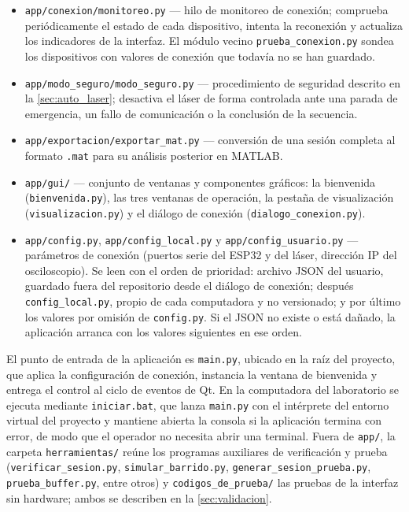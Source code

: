 {\begin{itemize}
  \item \texttt{app/conexion/monitoreo.py} — hilo de monitoreo de
    conexión; comprueba periódicamente el estado de cada dispositivo,
    intenta la reconexión y actualiza los indicadores de la interfaz.
    El módulo vecino \texttt{prueba\_conexion.py} sondea los
    dispositivos con valores de conexión que todavía no se han
    guardado.

  \item \texttt{app/modo\_seguro/modo\_seguro.py} — procedimiento de
    seguridad descrito en la \cref{sec:auto_laser}; desactiva el láser
    de forma controlada ante una parada de emergencia, un fallo de
    comunicación o la conclusión de la secuencia.

  \item \texttt{app/exportacion/exportar\_mat.py} — conversión de una
    sesión completa al formato \texttt{.mat} para su análisis
    posterior en MATLAB.

  \item \texttt{app/gui/} — conjunto de ventanas y componentes
    gráficos: la bienvenida (\texttt{bienvenida.py}), las tres
    ventanas de operación, la pestaña de visualización
    (\texttt{visualizacion.py}) y el diálogo de conexión
    (\texttt{dialogo\_conexion.py}).

  \item \texttt{app/config.py}, \texttt{app/config\_local.py} y
    \texttt{app/config\_usuario.py} — parámetros de conexión (puertos
    serie del ESP32 y del láser, dirección IP del osciloscopio). Se
    leen con el orden de prioridad: archivo JSON del usuario, guardado
    fuera del repositorio desde el diálogo de conexión; después
    \texttt{config\_local.py}, propio de cada computadora y no
    versionado; y por último los valores por omisión de
    \texttt{config.py}. Si el JSON no existe o está dañado, la
    aplicación arranca con los valores siguientes en ese orden.
\end{itemize}
\par}

El punto de entrada de la aplicación es \texttt{main.py}, ubicado en la
raíz del proyecto, que aplica la configuración de conexión, instancia
la ventana de bienvenida y entrega el control al ciclo de eventos de
Qt. En la computadora del laboratorio se ejecuta mediante
\texttt{iniciar.bat}, que lanza \texttt{main.py} con el intérprete del
entorno virtual del proyecto y mantiene abierta la consola si la
aplicación termina con error, de modo que el operador no necesita
abrir una terminal. Fuera de \texttt{app/}, la carpeta
\texttt{herramientas/} reúne los programas auxiliares de verificación
y prueba (\texttt{verificar\_sesion.py}, \texttt{simular\_barrido.py},
\texttt{generar\_sesion\_prueba.py}, \texttt{prueba\_buffer.py}, entre
otros) y \texttt{codigos\_de\_prueba/} las pruebas de la interfaz sin
hardware; ambos se describen en la \cref{sec:validacion}.

